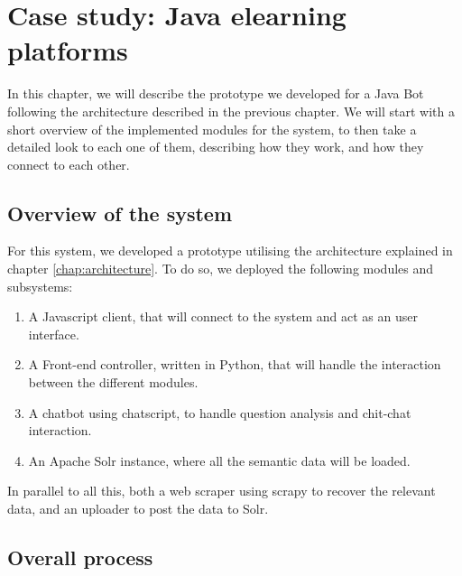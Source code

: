 \chapter{Case study: Java elearning platforms}
\label{chap:usecasejava}

\begin{chapterintro}

In this chapter, we will describe the prototype we developed for a Java Bot following the architecture described in the previous chapter. We will start with a short overview of the implemented modules for the system, to then take a detailed look to each one of them, describing how they work, and how they connect to each other.
 
\end{chapterintro}

\cleardoublepage

\section{Overview of the system}

For this system, we developed a prototype utilising the architecture explained in chapter \ref{chap:architecture}. To do so, we deployed the following modules and subsystems:

\begin{enumerate}
 \item A Javascript client, that will connect to the system and act as an user interface.
 \item A Front-end controller, written in Python, that will handle the interaction between the different modules.
 \item A chatbot using chatscript, to handle question analysis and chit-chat interaction.
 \item An Apache Solr instance, where all the semantic data will be loaded.
\end{enumerate}

In parallel to all this, both a web scraper using scrapy to recover the relevant data, and an uploader to post the data to Solr.


\section{Overall process}

